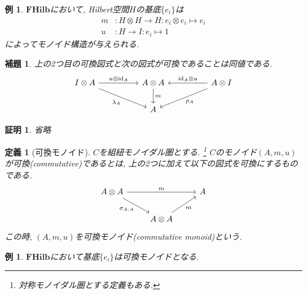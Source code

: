 \documentclass[a4paper,12pt]{ltjsarticle}
\theoremstyle{break}
\newtheorem{defn}[thm]{定義}
\newtheorem{lem}[thm]{補題}
\newtheorem{eg}[thm]{例}
\newtheorem*{prf}{証明}
\newcommand{\cset}{\mathbf{Set}}
\newcommand{\fhilb}{\mathbf{FHilb}}
\newcommand{\id}{\mathrm{id}}
\newcommand{\la}{\lambda}
\newcommand{\si}{\sigma}
\newcommand{\mt}{\mapsto}
\newcommand{\ot}{\otimes}
\numberwithin{equation}{section}
\begin{document}
\begin{eg}
  $\fhilb$において, Hilbert空間$H$の基底$\{e_i\}$は
  \begin{align*}
    m&: H \ot H \to H: e_i \ot e_i \mt e_i \\
    u&: H \to I: e_i \mt 1
  \end{align*}
  によってモノイド構造が与えられる. 
\end{eg}


\begin{lem} 
  上の2つ目の可換図式と次の図式が可換であることは同値である.
  \[\begin{tikzcd}
    {I \ot A} && {A \ot A} && {A \ot I} \\
    && A
    \arrow["{\id_A \ot u}"', from=1-5, to=1-3]
    \arrow["{u \ot \id_A}", from=1-1, to=1-3]
    \arrow["m", from=1-3, to=2-3]
    \arrow["{\rho_A}", from=1-5, to=2-3]
    \arrow["{\la_A}"', from=1-1, to=2-3]
  \end{tikzcd}\]
\end{lem}

\begin{prf}
  省略
\end{prf}

\begin{defn}[可換モノイド]
  $C$を組紐モノイダル圏とする.
  \footnote{
    対称モノイダル圏とする定義もある. 
  } 
  $C$のモノイド$(A,m,u)$が可換(commutative)であるとは, 上の2つに加えて以下の図式を可換にするものである. 
  \[\begin{tikzcd}
    {A \ot A} && A \\
    & {A \ot A}
    \arrow["m", from=1-1, to=1-3]
    \arrow["{\si_{A,A}}"', from=1-1, to=2-2]
    \arrow["m"', from=2-2, to=1-3]
  \end{tikzcd}\]
  この時, $(A,m,u)$を可換モノイド(commutative monoid)という. 
\end{defn}

\begin{eg}
  $\fhilb$において基底$\{e_i\}$は可換モノイドとなる. 
\end{eg}
\end{document}
